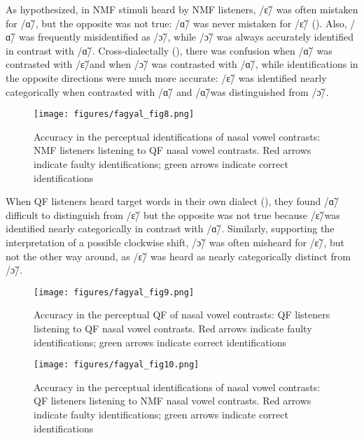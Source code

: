 \documentclass[output=paper,colorlinks,citecolor=brown]{langscibook}
\begin{document}
As hypothesized, in NMF stimuli heard by NMF listeners, /ɛ̃/ was often mistaken for /ɑ̃/, but the opposite was not true: /ɑ̃/ was never mistaken for /ɛ̃/ (). Also, /ɑ̃/ was frequently misidentified as /ɔ̃/, while /ɔ̃/ was always accurately identified in contrast with /ɑ̃/.  Cross-dialectally (), there was confusion when /ɑ̃/ was contrasted with /ɛ̃/and when /ɔ̃/ was contrasted with /ɑ̃/, while identifications in the opposite directions were much more accurate: /ɛ̃/ was identified nearly categorically when contrasted with /ɑ̃/ and /ɑ̃/was distinguished from /ɔ̃/.

\begin{figure}

    \texttt{[image: figures/fagyal\_fig8.png]}
    \caption{Accuracy in the perceptual identifications of nasal vowel contrasts: NMF listeners listening to QF nasal vowel contrasts. Red arrows indicate faulty identifications; green arrows indicate correct identifications \citep[based on][]{NicholasCarignan2019}}
    \label{fig:8}
\end{figure}

When QF listeners heard target words in their own dialect (), they found /ɑ̃/ difficult to distinguish from /ɛ̃/ but the opposite was not true because /ɛ̃/was identified nearly categorically in contrast with
/ɑ̃/.  Similarly, supporting the interpretation of a possible clockwise shift, /ɔ̃/ was often misheard for /ɛ̃/,
but not the other way around, as /ɛ̃/ was heard as nearly categorically distinct from /ɔ̃/.

\begin{figure}

    \texttt{[image: figures/fagyal\_fig9.png]}
    \caption{Accuracy in the perceptual QF of nasal vowel contrasts: QF listeners listening to QF nasal vowel contrasts. Red arrows indicate faulty identifications; green arrows indicate correct identifications      \citep[based on][]{NicholasCarignan2019}}
    \label{fig:9}
\end{figure}

\begin{figure}

    \texttt{[image: figures/fagyal\_fig10.png]}
    \caption{Accuracy in the perceptual identifications of nasal vowel contrasts: QF listeners listening to NMF nasal vowel contrasts. Red arrows indicate faulty identifications; green arrows indicate correct identifications \citep[based on][]{NicholasCarignan2019}}
    \label{fig:10}
\end{figure}
\end{document}
